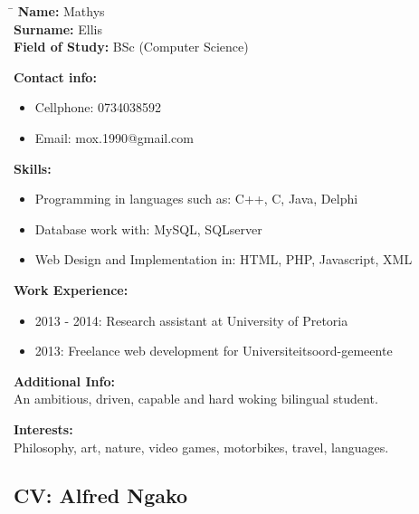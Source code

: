 \documentclass[12pt]{article}
\begin{document}
	\begin{flushleft}
		\begin{tabbing}
			\hspace*{4cm}\=\hspace*{3cm}\kill
			\textbf{Name:} \> Mathys \\	
			\textbf{Surname:} \> Ellis \\
			\textbf{Field of Study:} \> BSc (Computer Science)
		\end{tabbing}
		
		\textbf{Contact info:}	
		\begin{itemize}
			\item Cellphone: 0734038592
			\item Email: mox.1990@gmail.com
		\end{itemize}
	
		\textbf{Skills:}
		\begin{itemize}
			\item Programming in languages such as: C++, C, Java, Delphi
			\item Database work with: MySQL, SQLserver
			\item Web Design and Implementation in: HTML, PHP, Javascript, XML
		\end{itemize}
	
		\textbf{Work Experience:}
		\begin{itemize}
			\item 2013 - 2014: Research assistant at University of Pretoria
			\item 2013: Freelance web development for Universiteitsoord-gemeente 
		\end{itemize}
	
		\textbf{Additional Info:} \\
		\vspace{0.1in}
	 	An ambitious, driven, capable and hard woking bilingual student. \\
		\vspace{0.1in}
		
		\textbf{Interests:} \\
		\vspace{0.1in}
	 	Philosophy, art, nature, video games, motorbikes, travel, languages. \\
	 	\vspace{0.1in}
	\end{flushleft}
	
	\newpage
	\subsection{CV: Alfred Ngako}
	\colorbox{green}{\makebox[475px]{}}
	
\end{document}
